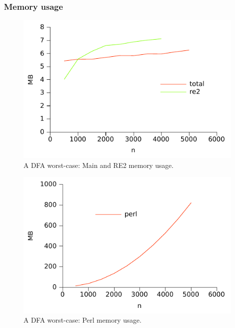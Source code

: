 \subsubsection*{Memory usage}

\begin{figure}
\centering
\includegraphics{benchmarks/memory/dfaworstcase_mainre2.pdf}
\caption{A DFA worst-case: Main and RE2 memory usage.}
\label{fig:dfaworstcase_mem_mainre2}
\end{figure}

\begin{figure}
\centering
\includegraphics{benchmarks/memory/dfaworstcase_perl.pdf}
\caption{A DFA worst-case: Perl memory usage.}
\label{fig:dfaworstcase_mem_perl}
\end{figure}

